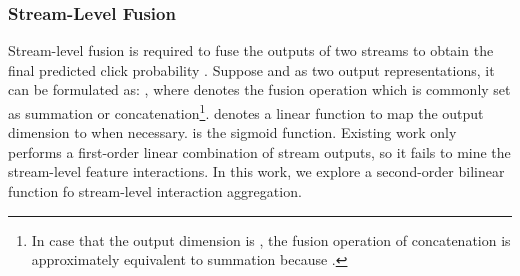 \documentclass[letterpaper]{article} \usepackage{aaai23}  \usepackage{times}  \usepackage{helvet}  \usepackage{courier}  \usepackage[hyphens]{url}  \usepackage{graphicx} \urlstyle{rm} \def\UrlFont{\rm}  \usepackage{natbib}  \usepackage{caption} \frenchspacing  \setlength{\pdfpagewidth}{8.5in}  \setlength{\pdfpageheight}{11in}  \usepackage{algorithm}
\begin{document}
\subsubsection{\textbf{Stream-Level Fusion}}
Stream-level fusion is required to fuse the outputs of two streams to obtain the final predicted click probability . 
Suppose  and  as two output representations, it can be formulated as:
,
where  denotes the fusion operation which is commonly set as summation or concatenation\footnote{In case that the output dimension is , the fusion operation of concatenation is approximately equivalent to summation because .}.  denotes a linear function to map the output dimension to  when necessary.  is the sigmoid function. Existing work only performs a first-order linear combination of stream outputs, so it fails to mine the stream-level feature interactions. In this work, we explore a second-order bilinear function fo stream-level interaction aggregation.
\end{document}
